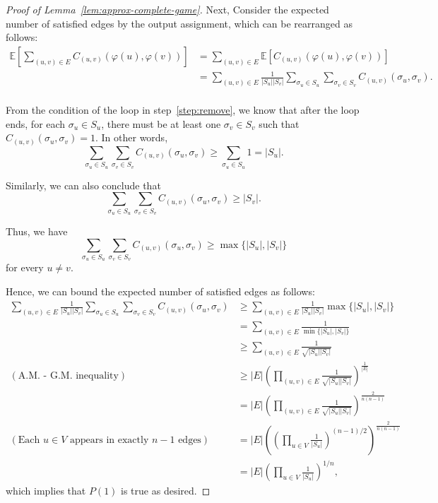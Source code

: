\documentclass{article}
\begin{document}
\begin{proof}[Proof of Lemma~\ref{lem:approx-complete-game}]
Next, Consider the expected number of satisfied edges by the output assignment, which can be rearranged as follows:
\begin{align*}
  \mathbb{E}\left[\sum_{(u, v) \in E} C_{(u, v)}(\varphi(u), \varphi(v))\right] &= \sum_{(u, v) \in E} \mathbb{E}\left[C_{(u, v)}(\varphi(u), \varphi(v))\right] \\
  &= \sum_{(u, v) \in E} \frac{1}{|S_u||S_v|} \sum_{\sigma_u \in S_u} \sum_{\sigma_v \in S_v} C_{(u, v)}(\sigma_u, \sigma_v). \\
\end{align*}

From the condition of the loop in step~\ref{step:remove}, we know that after the loop ends, for each $\sigma_u \in S_u$, there must be at least one $\sigma_v \in S_v$ such that $C_{(u, v)}(\sigma_u, \sigma_v) = 1$. In other words, $$\sum_{\sigma_u \in S_u} \sum_{\sigma_v \in S_v} C_{(u, v)}(\sigma_u, \sigma_v) \geq \sum_{\sigma_u \in S_u} 1 = |S_u|.$$

Similarly, we can also conclude that $$\sum_{\sigma_u \in S_u} \sum_{\sigma_v \in S_v} C_{(u, v)}(\sigma_u, \sigma_v) \geq |S_v|.$$

Thus, we have $$\sum_{\sigma_u \in S_u} \sum_{\sigma_v \in S_v} C_{(u, v)}(\sigma_u, \sigma_v) \geq \max\{|S_u|,|S_v|\}$$ for every $u \neq v$.

Hence, we can bound the expected number of satisfied edges as follows:
\begin{align*}
  \sum_{(u, v) \in E} \frac{1}{|S_u||S_v|} \sum_{\sigma_u \in S_u} \sum_{\sigma_v \in S_v} C_{(u, v)}(\sigma_u, \sigma_v)
  &\geq \sum_{(u, v) \in E} \frac{1}{|S_u||S_v|} \max\{|S_u|, |S_v|\} \\
  &= \sum_{(u, v) \in E} \frac{1}{\min\{|S_u|, |S_v|\}} \\
  &\geq \sum_{(u, v) \in E} \frac{1}{\sqrt{|S_u||S_v|}} \\
  (\text{A.M. - G.M. inequality}) &\geq |E| \left(\prod_{(u, v) \in E} \frac{1}{\sqrt{|S_u||S_v|}}\right)^{\frac{1}{|E|}} \\
  &= |E| \left(\prod_{(u, v) \in E} \frac{1}{\sqrt{|S_u||S_v|}}\right)^{\frac{2}{n(n-1)}} \\
  (\text{Each } u \in V \text{ appears in exactly } n - 1 \text{ edges}) &= |E| \left(\left(\prod_{u \in V} \frac{1}{|S_u|}\right)^{(n-1)/2}\right)^{\frac{2}{n(n-1)}} \\
  &= |E| \left(\prod_{u \in V} \frac{1}{|S_u|}\right)^{1/n},
\end{align*}
which implies that $P(1)$ is true as desired.


\end{proof}
\end{document}

